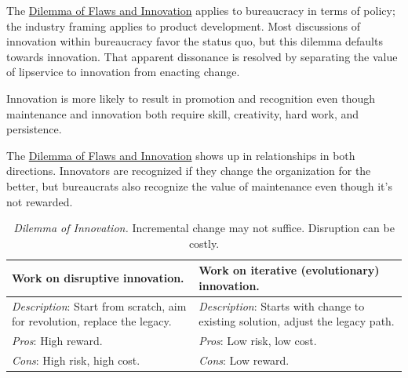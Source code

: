 The \hyperref[table:dilemma-personal-flaws-and-innovation]{Dilemma of Flaws and Innovation} applies to bureaucracy in terms of policy; the industry framing applies to product development. Most discussions of innovation within bureaucracy favor the status quo, but this dilemma defaults towards innovation. That apparent dissonance is resolved by separating the value of lipservice to innovation from enacting change.

Innovation is more likely to result in promotion and recognition even though maintenance and innovation both require skill, creativity, hard work, and persistence. 

The \hyperref[table:dilemma-personal-flaws-and-innovation]{Dilemma of Flaws and Innovation} shows up in relationships in both directions. Innovators are recognized if they change the organization for the better, but bureaucrats also recognize the value of maintenance even though it's not rewarded. 


\begin{center}
\begin{table}[H] %
\begin{tabular}{ | m{\dilemmatablewidth}| m{\dilemmatablewidth} | } 
  \hline
  \textbf{Work on disruptive innovation.} &
  \textbf{Work on iterative (evolutionary) innovation.} \\
  \hline
  \textit{Description}: Start from scratch, aim for revolution, replace the legacy.  &
  \textit{Description}: Starts with change to existing solution, adjust the legacy path.  \\  
  \hline
  \textit{Pros}: High reward. & 
  \textit{Pros}: Low risk, low cost. \\
  \hline
  \textit{Cons}: High risk, high cost. & 
  \textit{Cons}: Low reward. \\
  \hline
\end{tabular}
\caption{\textit{Dilemma of Innovation.}
Incremental change may not suffice. Disruption can be costly.
}
\label{table:dilemma-personal-disruptive-or-iterative}
\end{table}
\end{center}

